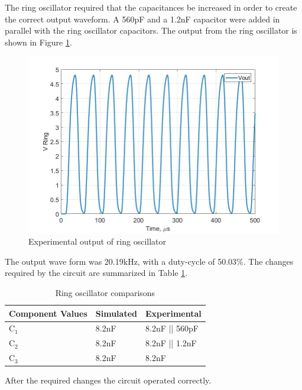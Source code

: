 
The ring oscillator required that the capacitances be increased in order to create the correct output waveform. A 560pF and a 1.2nF capacitor were added in parallel with the ring oscillator capacitors. The output from the ring oscillator is shown in Figure \ref{fig:vringout}.

\begin{figure}[H]
	\centering
	\includegraphics[width=0.6\linewidth]{ExperimentalImplementation/vring_out}
	\caption[Experimental ring output]{Experimental output of ring oscillator}
	\label{fig:vringout}
\end{figure}

The output wave form was 20.19kHz, with a duty-cycle of 50.03\%. The changes required by the circuit are summarized in Table \ref{tab:expvaluering}.

\begin{table}[H]
	\centering
	\caption{Ring oscillator comparisons}
	\label{tab:expvaluering}
	\begin{tabular}{|l|l|l|}
		\hline
		Component Values & Simulated & Experimental   \\ \hline
		C$_1$            & 8.2nF     & 8.2nF || 560pF \\ \hline
		C$_2$            & 8.2nF     & 8.2nF || 1.2nF \\ \hline
		C$_3$            & 8.2nF     & 8.2nF          \\ \hline
	\end{tabular}
\end{table}

After the required changes the circuit operated correctly.


